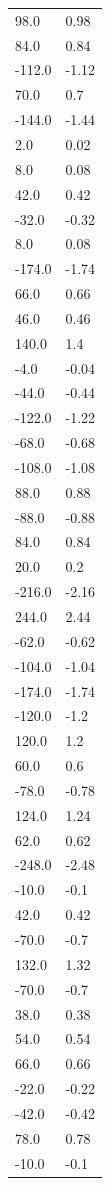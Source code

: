 \begin{longtable}{ll}
98.0 & 0.98 \\
84.0 & 0.84 \\
-112.0 & -1.12 \\
70.0 & 0.7 \\
-144.0 & -1.44 \\
2.0 & 0.02 \\
8.0 & 0.08 \\
42.0 & 0.42 \\
-32.0 & -0.32 \\
8.0 & 0.08 \\
-174.0 & -1.74 \\
66.0 & 0.66 \\
46.0 & 0.46 \\
140.0 & 1.4 \\
-4.0 & -0.04 \\
-44.0 & -0.44 \\
-122.0 & -1.22 \\
-68.0 & -0.68 \\
-108.0 & -1.08 \\
88.0 & 0.88 \\
-88.0 & -0.88 \\
84.0 & 0.84 \\
20.0 & 0.2 \\
-216.0 & -2.16 \\
244.0 & 2.44 \\
-62.0 & -0.62 \\
-104.0 & -1.04 \\
-174.0 & -1.74 \\
-120.0 & -1.2 \\
120.0 & 1.2 \\
60.0 & 0.6 \\
-78.0 & -0.78 \\
124.0 & 1.24 \\
62.0 & 0.62 \\
-248.0 & -2.48 \\
-10.0 & -0.1 \\
42.0 & 0.42 \\
-70.0 & -0.7 \\
132.0 & 1.32 \\
-70.0 & -0.7 \\
38.0 & 0.38 \\
54.0 & 0.54 \\
66.0 & 0.66 \\
-22.0 & -0.22 \\
-42.0 & -0.42 \\
78.0 & 0.78 \\
-10.0 & -0.1 \\

\end{longtable}
